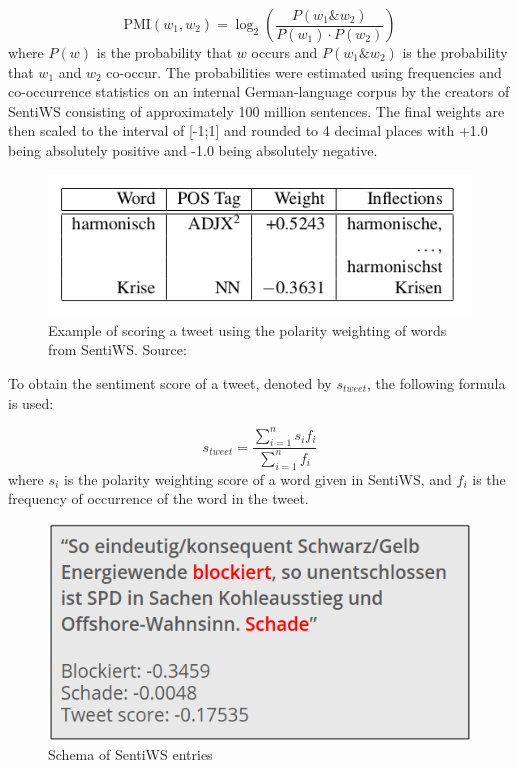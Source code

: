 \documentclass[12pt,onecolumn,twoside]{layout}
\begin{document}
\begin{equation}
\label{eq:pmi}
\text{PMI}(w_1,w_2) = \log_2\left(\frac{P(w_1 \& w_2)}{P(w_1) \cdot P(w_2)}\right)
\end{equation}
where \(P(w)\) is the probability that \(w\) occurs and \(P(w_1 \& w_2)\) is the probability that \(w_1\) and \(w_2\) co-occur. The probabilities were estimated using frequencies and co-occurrence statistics on an internal German-language corpus by the creators of SentiWS consisting of approximately 100 million sentences. The final weights are then scaled to the interval of [-1;1] and rounded to 4 decimal places with +1.0 being absolutely positive and -1.0 being absolutely negative.

\begin{figure} 
	\begin{center}
		\includegraphics[width=0.5\linewidth]{figures/sentiws_example2}
	\end{center}
	\caption{Example of scoring a tweet using the polarity weighting of words from SentiWS. Source: \cite{REMUS10.490}}
	\label{fig:sentiws_example}
\end{figure}

To obtain the sentiment score of a tweet, denoted by \(s_{tweet}\), the following formula is used: 

\begin{equation}
\label{eq:word_score}
s_{tweet} = \frac{\sum_{i=1}^{n} s_i f_i}{\sum_{i=1}^{n} f_i}
\end{equation} 
where \(s_i\) is the polarity weighting score of a word given in SentiWS, and \(f_i\) is the frequency of occurrence of the word in the tweet. 

\begin{figure} 
	\begin{center}
		\includegraphics[width=0.5\linewidth]{figures/sentiws_example_use}
	\end{center}
	\caption{Schema of SentiWS entries}
	\label{fig:sentiws_example_use}
\end{figure}
\end{document}
